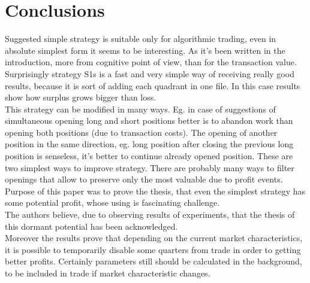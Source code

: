 \documentclass{tewiart}
\begin{document}
\section{Conclusions}
\indent Suggested simple strategy is suitable only for algorithmic trading, even in absolute simplest form it seems to be interesting. As it’s been written in the introduction, more from cognitive point of view, than for the transaction value.\\
\indent Surprisingly strategy S1s is a fast and very simple way of receiving really good results, because it is sort of adding each quadrant in one file. In this case results show how surplus grows bigger than loss. \\
\indent This strategy can be modified in many ways.  Eg. in case of suggestions of simultaneous opening long and short positions better is to abandon work than opening both positions (due to transaction costs). The opening of another position in the same direction, eg. long position after closing the previous long position is senseless, it’s better to continue already opened position. These are two simplest ways to improve strategy. There are probably many ways to filter openings that allow to preserve only the most valuable due to profit events. Purpose of this paper was to prove the thesis, that even the simplest strategy has some potential profit, whose using is fascinating challenge.\\
\indent The authors believe, due to observing results of experiments, that the thesis of this dormant potential has been acknowledged. \\
\indent Moreover the results prove that depending on the current market characteristics, it is possible to temporarily disable some quarters from trade in order to getting better profits. Certainly parameters still should be calculated in the background, to be included in trade if market characteristic changes.





\end{document}
